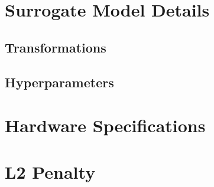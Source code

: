 \chapter{Surrogate Model Details}

\section{Transformations}\label{appendix:transformations}

\section{Hyperparameters}\label{appendix:surrogate-hyperparameters}

\chapter{Hardware Specifications}


\chapter{L2 Penalty}\label{appendix:l2-penalty}
